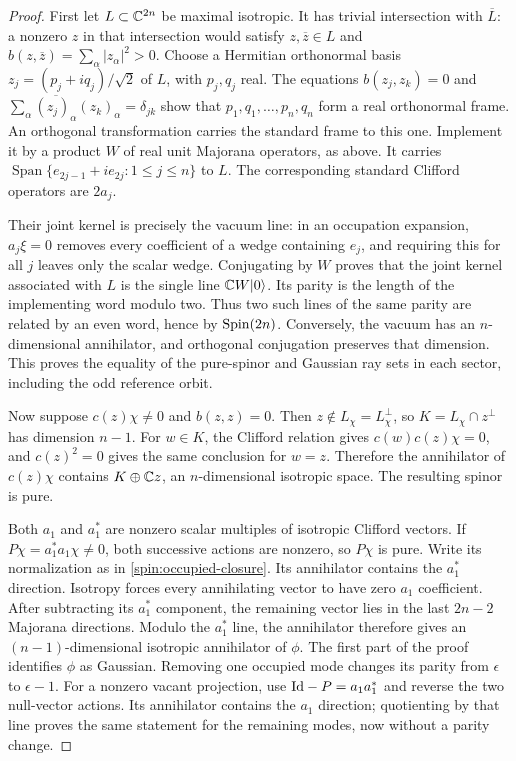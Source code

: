 \begin{proof}
First let $L\subset\mathbb C^{2n}$ be maximal isotropic.  It has trivial
intersection with $\overline L$: a nonzero $z$ in that intersection would
satisfy $z,\overline z\in L$ and
$b(z,\overline z)=\sum_\alpha|z_\alpha|^2>0$.
Choose a Hermitian orthonormal basis
$z_j=(p_j+iq_j)/\sqrt2$ of $L$, with $p_j,q_j$ real.
The equations $b(z_j,z_k)=0$ and
$\sum_\alpha\overline{(z_j)_\alpha}(z_k)_\alpha=\delta_{jk}$ show
that $p_1,q_1,\ldots,p_n,q_n$ form a real orthonormal frame.
An orthogonal transformation carries the standard frame to this one.
Implement it by a product $W$ of real unit Majorana operators, as above.
It carries
$\operatorname{Span}\{e_{2j-1}+ie_{2j}:1\le j\le n\}$ to $L$.
The corresponding standard Clifford operators are $2a_j$.

Their joint kernel is precisely the vacuum line: in an occupation
expansion, $a_j\xi=0$ removes every coefficient of a wedge containing
$e_j$, and requiring this for all $j$ leaves only the scalar wedge.
Conjugating by $W$ proves that the joint kernel associated with $L$ is
the single line $\mathbb C W|0\rangle$.
Its parity is the length of the implementing word modulo two.  Thus
two such lines of the same parity are related by an even word, hence
by $\operatorname{Spin}(2n)$.  Conversely, the vacuum has an $n$-dimensional
annihilator, and orthogonal conjugation preserves that dimension.
This proves the equality of the pure-spinor and Gaussian ray sets in
each sector, including the odd reference orbit.

Now suppose $c(z)\chi\ne0$ and $b(z,z)=0$.  Then
$z\notin L_\chi=L_\chi^\perp$, so
$K=L_\chi\cap z^\perp$ has dimension $n-1$.
For $w\in K$, the Clifford relation gives
$c(w)c(z)\chi=0$, and $c(z)^2=0$ gives the same conclusion for $w=z$.
Therefore the annihilator of $c(z)\chi$ contains
$K\oplus\mathbb C z$, an $n$-dimensional isotropic space.  The resulting
spinor is pure.

Both $a_1$ and $a_1^*$ are nonzero scalar multiples of isotropic
Clifford vectors.  If $P\chi=a_1^*a_1\chi\ne0$, both successive
actions are nonzero, so $P\chi$ is pure.  Write its normalization as
in \eqref{spin:occupied-closure}.  Its annihilator contains the
$a_1^*$ direction.  Isotropy forces every annihilating vector to have
zero $a_1$ coefficient.  After subtracting its $a_1^*$ component,
the remaining vector lies in the last $2n-2$ Majorana directions.
Modulo the $a_1^*$ line, the annihilator therefore gives an
$(n-1)$-dimensional isotropic annihilator of $\phi$.
The first part of the proof identifies $\phi$ as Gaussian.  Removing
one occupied mode changes its parity from $\epsilon$ to $\epsilon-1$.
For a nonzero vacant projection, use $\mathrm{Id}-P=a_1a_1^*$ and reverse
the two null-vector actions.  Its annihilator contains the $a_1$
direction; quotienting by that line proves the same statement for
the remaining modes, now without a parity change.
\end{proof}

